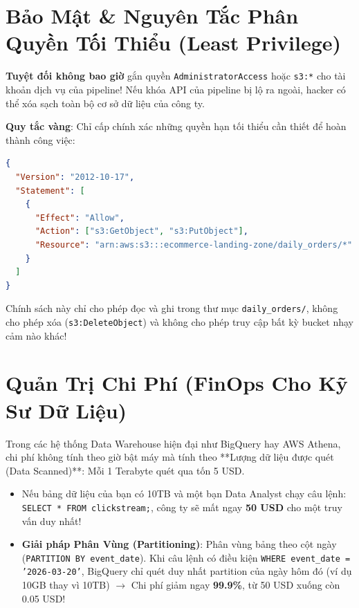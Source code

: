 \section{Bảo Mật \& Nguyên Tắc Phân Quyền Tối Thiểu (Least Privilege)}

\begin{lythuyetbox}
\textbf{Tuyệt đối không bao giờ} gắn quyền \texttt{AdministratorAccess} hoặc \texttt{s3:*} cho tài khoản dịch vụ của pipeline!
Nếu khóa API của pipeline bị lộ ra ngoài, hacker có thể xóa sạch toàn bộ cơ sở dữ liệu của công ty.

\textbf{Quy tắc vàng}: Chỉ cấp chính xác những quyền hạn tối thiểu cần thiết để hoàn thành công việc:
\begin{lstlisting}[language=json]
{
  "Version": "2012-10-17",
  "Statement": [
    {
      "Effect": "Allow",
      "Action": ["s3:GetObject", "s3:PutObject"],
      "Resource": "arn:aws:s3:::ecommerce-landing-zone/daily_orders/*"
    }
  ]
}
\end{lstlisting}
Chính sách này chỉ cho phép đọc và ghi trong thư mục \texttt{daily\_orders/}, không cho phép xóa (\texttt{s3:DeleteObject}) và không cho phép truy cập bất kỳ bucket nhạy cảm nào khác!
\end{lythuyetbox}

\section{Quản Trị Chi Phí (FinOps Cho Kỹ Sư Dữ Liệu)}

Trong các hệ thống Data Warehouse hiện đại như BigQuery hay AWS Athena, chi phí không tính theo giờ bật máy mà tính theo **Lượng dữ liệu được quét (Data Scanned)**: Mỗi 1 Terabyte quét qua tốn 5 USD.
\begin{itemize}
    \item Nếu bảng dữ liệu của bạn có 10TB và một bạn Data Analyst chạy câu lệnh: \texttt{SELECT * FROM clickstream;}, công ty sẽ mất ngay \textbf{50 USD} cho một truy vấn duy nhất!
    \item \textbf{Giải pháp Phân Vùng (Partitioning)}: Phân vùng bảng theo cột ngày (\texttt{PARTITION BY event\_date}). Khi câu lệnh có điều kiện \texttt{WHERE event\_date = '2026-03-20'}, BigQuery chỉ quét duy nhất partition của ngày hôm đó (ví dụ 10GB thay vì 10TB) $\rightarrow$ Chi phí giảm ngay \textbf{99.9\%}, từ 50 USD xuống còn 0.05 USD!
\end{itemize}

